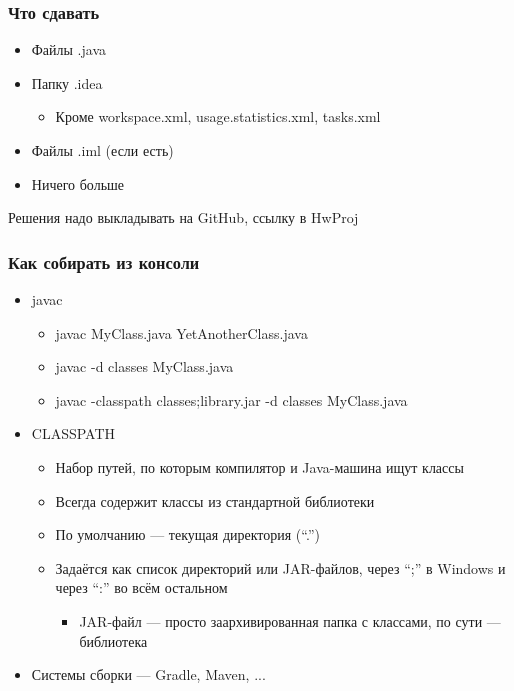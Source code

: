 \documentclass[xetex,mathserif,serif]{beamer}
\begin{document}
	\begin{frame}
		\frametitle{Что сдавать}
		\begin{itemize}
			\item Файлы .java
			\item Папку .idea
			\begin{itemize}
				\item Кроме workspace.xml, usage.statistics.xml, tasks.xml
			\end{itemize}
			\item Файлы .iml (если есть)
			\item Ничего больше
		\end{itemize}
		Решения надо выкладывать на GitHub, ссылку в HwProj
	\end{frame}

	\begin{frame}
		\frametitle{Как собирать из консоли}
		\begin{itemize}
			\item javac
			\begin{itemize}
				\item javac MyClass.java YetAnotherClass.java
				\item javac -d classes MyClass.java
				\item javac -classpath classes;library.jar -d classes MyClass.java
			\end{itemize}
			\item CLASSPATH
			\begin{itemize}
				\item Набор путей, по которым компилятор и Java-машина ищут классы
				\item Всегда содержит классы из стандартной библиотеки
				\item По умолчанию --- текущая директория (``.'')
				\item Задаётся как список директорий или JAR-файлов, через ``;'' в Windows и через ``:'' во всём остальном
				\begin{itemize}
					\item JAR-файл --- просто заархивированная папка с классами, по сути --- библиотека
				\end{itemize}
			\end{itemize}
			\item Системы сборки --- Gradle, Maven, ...
		\end{itemize}
	\end{frame}
\end{document}
